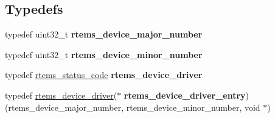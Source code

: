 \subsection*{Typedefs}
\begin{DoxyCompactItemize}
\item 
\mbox{\label{group__ClassicIO_ga8c94033ade3693e6ff810228c55ec356}} 
typedef uint32\+\_\+t {\bfseries rtems\+\_\+device\+\_\+major\+\_\+number}
\item 
\mbox{\label{group__ClassicIO_gac08942e27cba6cdaf970ae2b8e3a266c}} 
typedef uint32\+\_\+t {\bfseries rtems\+\_\+device\+\_\+minor\+\_\+number}
\item 
\mbox{\label{group__ClassicIO_ga32cc350f6f395518b4fab50d19481e99}} 
typedef \mbox{\hyperlink{group__ClassicStatus_ga545d41846817eaba6143d52ee4d9e9fe}{rtems\+\_\+status\+\_\+code}} {\bfseries rtems\+\_\+device\+\_\+driver}
\item 
\mbox{\label{group__ClassicIO_ga34d2e2a2088ad35bde81942862f226b6}} 
typedef \mbox{\hyperlink{group__ClassicStatus_ga545d41846817eaba6143d52ee4d9e9fe}{rtems\+\_\+device\+\_\+driver}}($\ast$ {\bfseries rtems\+\_\+device\+\_\+driver\+\_\+entry}) (rtems\+\_\+device\+\_\+major\+\_\+number, rtems\+\_\+device\+\_\+minor\+\_\+number, void $\ast$)
\end{DoxyCompactItemize}
